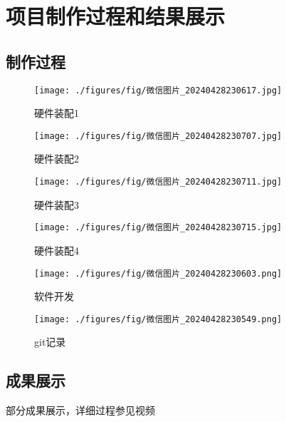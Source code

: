 \documentclass[12pt,hyperref,a4paper,UTF8]{ctexart}
\begin{document}
\section{项目制作过程和结果展示}
  \subsection*{制作过程}
\begin{figure}[htbp]
  \centering
  \begin{minipage}{0.46\textwidth}
    \texttt{[image: ./figures/fig/微信图片\_20240428230617.jpg]}
    \caption{硬件装配1}
  \end{minipage}
  \begin{minipage}{0.46\textwidth}
    \texttt{[image: ./figures/fig/微信图片\_20240428230707.jpg]}
    \caption{硬件装配2}
  \end{minipage}
  \begin{minipage}{0.46\textwidth}
    \texttt{[image: ./figures/fig/微信图片\_20240428230711.jpg]}
    \caption{硬件装配3}
  \end{minipage}
  \begin{minipage}{0.46\textwidth}
    \texttt{[image: ./figures/fig/微信图片\_20240428230715.jpg]}
    \caption{硬件装配4}
  \end{minipage}
  \centering
  \begin{minipage}{0.46\textwidth}
    \texttt{[image: ./figures/fig/微信图片\_20240428230603.png]}
    \caption{软件开发}
  \end{minipage}
  \begin{minipage}{0.46\textwidth}
    \texttt{[image: ./figures/fig/微信图片\_20240428230549.png]}
    \caption{git记录}
  \end{minipage}
\end{figure}
\newpage

  \subsection*{成果展示}
  部分成果展示，详细过程参见视频
\end{document}
